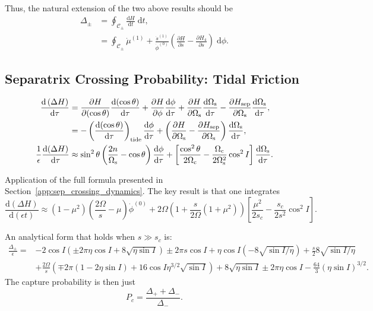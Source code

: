 \documentclass[
        fleqn,
        usenatbib,
    ]{mnras}
\newcommand*{\rd}[2]{\frac{\mathrm{d}#1}{\mathrm{d}#2}}
\newcommand*{\pd}[2]{\frac{\partial#1}{\partial#2}}
\newcommand*{\p}[1]{\left(#1\right)}
\newcommand*{\s}[1]{\left[#1\right]}
\begin{document}
Thus, the natural extension of the two above results should be
\begin{align}
    \Delta_{\pm} &= \oint_{\mathcal{C}_{\pm}} \rd{H}{t}\;\mathrm{d}t,\\
        &= \oint_{\mathcal{C}_{\pm}}
            \dot{\mu}^{(1)} + \frac{\dot{s}^{(1)}}{\dot{\phi}^{(0)}}
                \p{\pd{H}{s} - \pd{H_4}{s}}\;\mathrm{d}\phi.
\end{align}

\subsection{Separatrix Crossing Probability: Tidal Friction}\label{app:probs}
\begin{align}
    \rd{\p{\Delta H}}{\tau} &=
            \pd{H}{(\cos \theta)}\rd{(\cos \theta)}{\tau}
            + \pd{H}{\phi}\rd{\phi}{\tau}
            + \pd{H}{\Omega_{\rm s}}\rd{\Omega_{\rm s}}{\tau}
            - \pd{H_{\rm sep}}{\Omega_{\rm s}}\rd{\Omega_{\rm s}}{\tau}
                    ,\nonumber\\
        &= -\p{\rd{(\cos\theta)}{\tau}}_{\rm tide} \rd{\phi}{\tau}
            + \p{\pd{H}{\Omega_{\rm s}} - \pd{H_{\rm sep}}{\Omega_{\rm s}}}
            \rd{\Omega_{\rm s}}{\tau},\label{eq:dHdt_schematic}\\
    \frac{1}{\epsilon}\rd{(\Delta H)}{\tau} &\approx
            \sin^2\theta\p{\frac{2n}{\Omega_{\rm s}} - \cos\theta}
                \rd{\phi}{\tau} +
                \s{\frac{\cos^2\theta}{2\Omega_{\rm c}} - \frac{\Omega_{\rm
                c}}{2\Omega_{\rm s}^2}\cos^2 I}\rd{\Omega_{\rm
                s}}{\tau}.\label{eq:dHdt_final}
\end{align}

Application of the full formula presented in
Section~\ref{app:sep_crossing_dynamics}. The key result is that one integrates
\begin{equation}
    \rd{(\Delta H)}{(\epsilon t)} \approx
            (1 - \mu^2)\p{\frac{2\Omega}{s} - \mu}
                \dot{\phi}^{(0)} + 2\Omega\p{1 + \frac{s}{2\Omega}(1 + \mu^2)}
                \s{\frac{\mu^2}{2s_c} - \frac{s_c}{2s^2}\cos^2 I}.
\end{equation}

An analytical form that holds when $s \gg s_c$ is:
\begin{align}
    \frac{\Delta_{\pm}}{\epsilon} ={}&
        -2\cos I\p{\pm 2\pi \eta \cos I + 8\sqrt{\eta \sin I}}
        \pm 2\pi s\cos I
        + \eta \cos I \p{-8\sqrt{\sin I / \eta}}
            + \frac{s}{2}8\sqrt{\sin I/\eta}\nonumber\\
        &+ \frac{2\Omega}{s}\p{\mp 2\pi\p{1 - 2\eta \sin I}
            + 16\cos I \eta^{3/2}\sqrt{\sin I}}
            + 8\sqrt{\eta \sin I}
            \pm 2 \pi \eta \cos I
            - \frac{64}{3} \p{\eta \sin I}^{3/2}.
\end{align}
The capture probability is then just
\begin{equation}
    P_c = \frac{\Delta_+ + \Delta_-}{\Delta_-}.
\end{equation}

\label{lastpage} %
\end{document}
